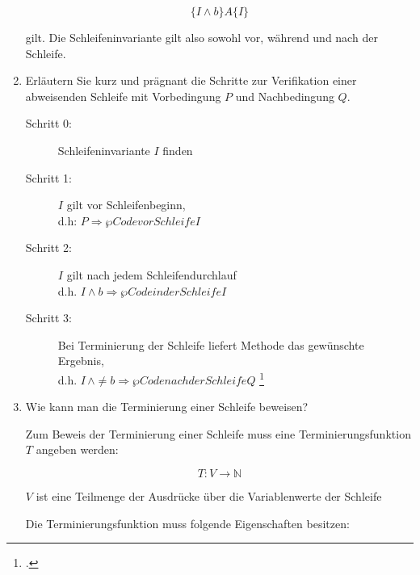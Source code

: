 \documentclass{lehramt-informatik-aufgabe}
\begin{document}
\begin{enumerate}
\begin{liAntwort}
\begin{displaymath}
\{ I \wedge b \} A \{ I \}
\end{displaymath}

\noindent
gilt. Die Schleifeninvariante gilt also sowohl vor, während und nach der
Schleife.
\end{liAntwort}


\item Erläutern Sie kurz und prägnant die Schritte zur Verifikation
einer abweisenden Schleife mit Vorbedingung $P$ und Nachbedingung $Q$.

\begin{liAntwort}
\begin{description}
\item[Schritt 0:] Schleifeninvariante $I$ finden

\item[Schritt 1:] $I$ gilt vor Schleifenbeginn,\\
d.h: $P \Rightarrow \wp{Code vor Schleife}{I}$

\item[Schritt 2:] $I$ gilt nach jedem Schleifendurchlauf\\
d.h. $I \land b \Rightarrow \wp{Code in der Schleife}{I}$

\item[Schritt 3:]

Bei Terminierung der Schleife liefert Methode das gewünschte Ergebnis,\\
d.h. $I \,\land \neq b \Rightarrow \wp{Code nach der Schleife}{Q}$
\footcite[Seite 31]{sosy:fs:5}
\end{description}
\end{liAntwort}


\item Wie kann man die Terminierung einer Schleife beweisen?

\begin{liAntwort}
Zum Beweis der Terminierung einer Schleife muss eine
Terminierungsfunktion $T$ angeben werden:

\begin{displaymath}
T \colon V \rightarrow \mathbb{N}
\end{displaymath}

\noindent
$V$ ist eine Teilmenge der Ausdrücke über die Variablenwerte der
Schleife

Die Terminierungsfunktion muss folgende Eigenschaften besitzen:


\end{liAntwort}
\end{enumerate}
\end{document}
